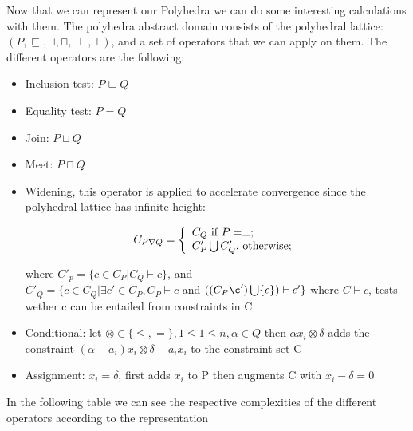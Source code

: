 Now that we can represent our Polyhedra we can do some interesting calculations with them. The polyhedra abstract domain consists of the polyhedral lattice:
	$(P,\sqsubseteq,\sqcup,\sqcap,\perp,\top)$, and a set of operators that we can apply on them. The different operators are the following:
	\begin{itemize}
		\item Inclusion test: $P \sqsubseteq Q$
		\item Equality test: $P=Q$
		\item Join: $P\sqcup Q$
		\item Meet: $P\sqcap Q$
		\item Widening, this operator is applied to accelerate convergence since the polyhedral lattice has infinite height:
		\begin{center}
		  \[
    C_{P\nabla Q}=\left\{
                \begin{array}{ll}
                  C_Q $ if $P=\perp ;\\
                  C'_P\bigcup C'_Q, $ otherwise$;
                \end{array}
              \right.
  	\]
		
		\end{center}

		where $C'_p=\{c\in C_P |C_Q \vdash c \}$, and\\  $C'_Q=\{c\in C_Q |\exists c' \in C_P,C_P \vdash c $ and $((C_P\c')\bigcup \{c\})\vdash c' \}$
		where $C\vdash c$, tests wether c can be entailed from constraints in C
		\item Conditional: let $\otimes \in \{\leq,=\},1\leq 1\leq n,\alpha \in Q$ then $\alpha x_i \otimes \delta$ adds the constraint $(\alpha-a_i)x_i \otimes\delta - a_i x_i$ to the constraint set C
		\item Assignment: $x_i = \delta$, first adds $x_i$ to P then augments C with $x_i -\delta = 0$
		
	\end{itemize}
	 In the following table we can see the respective complexities of the different operators according to the representation
	 

